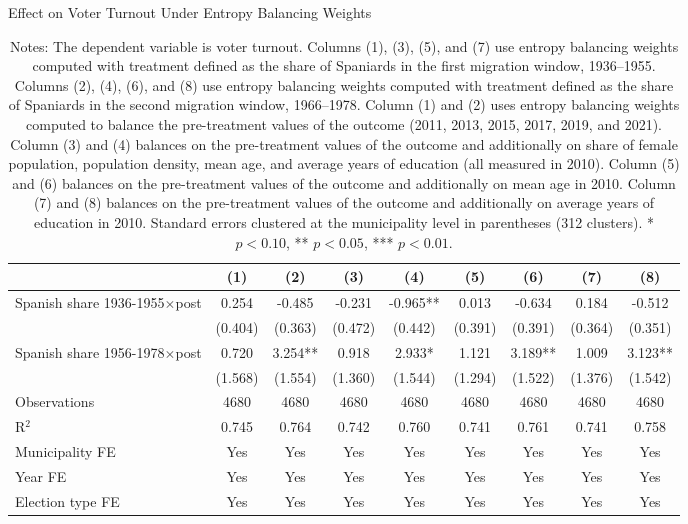 \begin{table}[!h]
\caption{Effect on Voter Turnout Under Entropy Balancing Weights}
\renewcommand{\arraystretch}{1.25}
\centering
\begin{tabular}[t]{lcccccccc}
\hline
  & (1) & (2) & (3) & (4) & (5) & (6) & (7) & (8)\\
\hline
Spanish share 1936-1955$\times$post & 0.254 & -0.485 & -0.231 & -0.965** & 0.013 & -0.634 & 0.184 & -0.512\\
 & (0.404) & (0.363) & (0.472) & (0.442) & (0.391) & (0.391) & (0.364) & (0.351)\\
Spanish share 1956-1978$\times$post & 0.720 & 3.254** & 0.918 & 2.933* & 1.121 & 3.189** & 1.009 & 3.123**\\
 & (1.568) & (1.554) & (1.360) & (1.544) & (1.294) & (1.522) & (1.376) & (1.542)\\

\addlinespace
Observations & 4680 & 4680 & 4680 & 4680 & 4680 & 4680 & 4680 & 4680\\
R$^2$ & 0.745 & 0.764 & 0.742 & 0.760 & 0.741 & 0.761 & 0.741 & 0.758\\
Municipality FE & Yes & Yes & Yes & Yes & Yes & Yes & Yes & Yes\\
Year FE & Yes & Yes & Yes & Yes & Yes & Yes & Yes & Yes\\
Election type FE & Yes & Yes & Yes & Yes & Yes & Yes & Yes & Yes\\
\hline
\end{tabular}
\vspace{0.3em}
\captionsetup{justification=justified, singlelinecheck=false}
\caption*{\footnotesize Notes: The dependent variable is voter turnout. Columns (1), (3), (5), and (7) use entropy balancing weights computed with treatment defined as the share of Spaniards in the first migration window, 1936–1955. Columns (2), (4), (6), and (8) use entropy balancing weights computed with treatment defined as the share of Spaniards in the second migration window, 1966–1978. Column (1) and (2) uses entropy balancing weights computed to balance the pre-treatment values of the outcome (2011, 2013, 2015, 2017, 2019, and 2021). Column (3) and (4) balances on the pre-treatment values of the outcome and additionally on share of female population, population density, mean age, and average years of education (all measured in 2010). Column (5) and (6) balances on the pre-treatment values of the outcome and additionally on mean age in 2010. Column (7) and (8) balances on the pre-treatment values of the outcome and additionally on average years of education in 2010. Standard errors clustered at the municipality level in parentheses (312 clusters). * $p<0.10$, ** $p<0.05$, *** $p<0.01$.}
\end{table}
